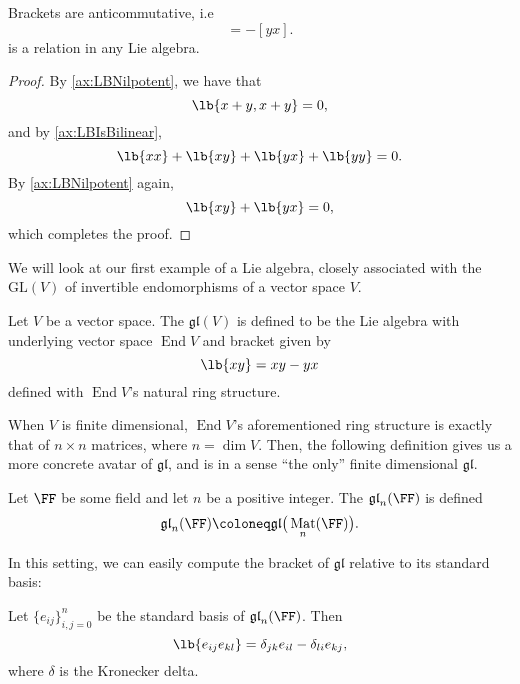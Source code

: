 \documentclass{article}
\DeclarePairedDelimiter\lb\lbrack\rbrack
\DeclareMathOperator{\End}{End}
\DeclareMathOperator{\Mat}{Mat}
\newcommand*\GL{\ensuremath{\text{GL}}}
\newcommand*\gl{\ensuremath{\mathfrak{gl}}}
\begin{document}
\begin{proposition}
    Brackets are anticommutative, i.e
    \begin{equation}
        [xy]
        =
        -[yx].
        \tag{L2'}
    \end{equation}
    is a relation in any Lie algebra.
\end{proposition}
\begin{proof}
    By \ref{ax:LBNilpotent}, we have that
    \[
        \lb{x+y,x+y}
        =
        0,
    \]
    and by \ref{ax:LBIsBilinear},
    \[
        \lb{xx} + \lb{xy} + \lb{yx} + \lb{yy}
        =
        0.
    \]
    By \ref{ax:LBNilpotent} again,
    \[
        \lb{xy} + \lb{yx}
        =
        0,
    \]
    which completes the proof.
\end{proof}

We will look at our first example of a Lie algebra, closely associated with the  $\GL(V)$ of invertible endomorphisms of a vector space $V$.

\begin{definition}[$\gl$, abstractly]
    Let $V$ be a vector space.
    The  $\gl(V)$ is defined to be the Lie algebra with underlying vector space $\End V$ and bracket given by
    \[
        \lb{xy}
        =
        xy - yx
    \]
    defined with $\End V$'s natural ring structure.
\end{definition}

    When $V$ is finite dimensional, $\End V$'s aforementioned ring structure is exactly that of $n \times n$ matrices, where $n = \dim V$.
    Then, the following definition gives us a more concrete avatar of $\gl$, and is in a sense ``the only'' finite dimensional $\gl$.

\begin{definition}[$\gl$, concretely]
    Let $\FF$ be some field and let $n$ be a positive integer.
    The  $\gl_n(\FF)$ is defined
    \[
        \gl_n(\FF)
        \coloneq
        \gl\big(\Mat_n(\FF)\big).
    \]
\end{definition}

In this setting, we can easily compute the bracket of $\gl$ relative to its standard basis:

\begin{proposition}
    Let $\{e_{ij}\}_{i,j=0}^n$ be the standard basis of $\gl_n(\FF)$.
    Then
    \[
        \lb{e_{ij}e_{kl}}
        =
        \delta_{jk}e_{il}
        -
        \delta_{li}e_{kj},
    \]
    where $\delta$ is the Kronecker delta.
\end{proposition}
\end{document}
